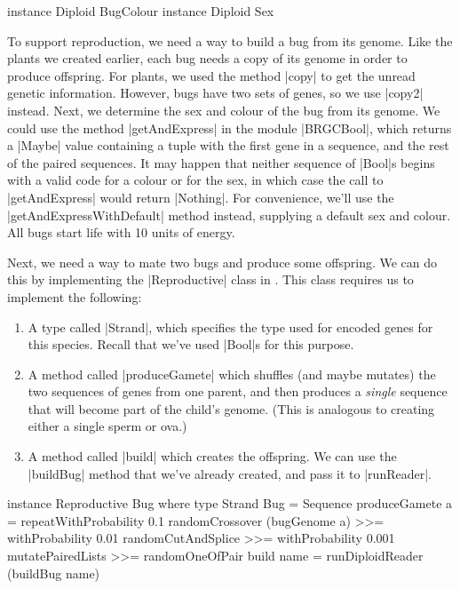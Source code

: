 \begin{code}
instance Diploid BugColour
instance Diploid Sex
\end{code} 

To support reproduction, we need a way to build a bug from its genome.
Like the plants we created earlier, each bug needs a copy of its genome in order to produce offspring.
For plants, we used the method |copy| to get the unread genetic information.
However, bugs have two sets of genes, so we use |copy2| instead.
Next, we determine the sex and colour of the bug from its genome.
We could use the method |getAndExpress| in the module |BRGCBool|, 
which returns a |Maybe| value containing a tuple with the first gene in a sequence,
and the rest of the paired sequences.
It may happen that neither sequence of |Bool|s begins with
a valid code for a colour or for the sex, in which case the call to |getAndExpress|
would return |Nothing|.
For convenience, we'll use the |getAndExpressWithDefault| method instead,
supplying a default sex and colour.
All bugs start life with 10 units of energy.

Next, we need a way to mate two bugs and produce some offspring.
We can do this by implementing the |Reproductive| class in 
.
This class requires us to implement the following:
\begin{enumerate}
\item A type called |Strand|, which specifies the type used for encoded
genes for this species. Recall that we've used |Bool|s for this purpose.
\item A method called |produceGamete| which shuffles (and maybe mutates)
the two sequences of genes from one parent, 
and then produces a \emph{single} sequence that will become part of the
child's genome.
(This is analogous to creating either a single sperm or ova.)
\item A method called |build| which creates the offspring.
We can use the |buildBug| method that we've already created,
and pass it to |runReader|.
\end {enumerate}

\begin{code}
instance Reproductive Bug where
  type Strand Bug = Sequence
  produceGamete a = 
    repeatWithProbability 0.1 randomCrossover (bugGenome a) >>=
    withProbability 0.01 randomCutAndSplice >>=
    withProbability 0.001 mutatePairedLists >>=
    randomOneOfPair
  build name = runDiploidReader (buildBug name)
\end{code} 

